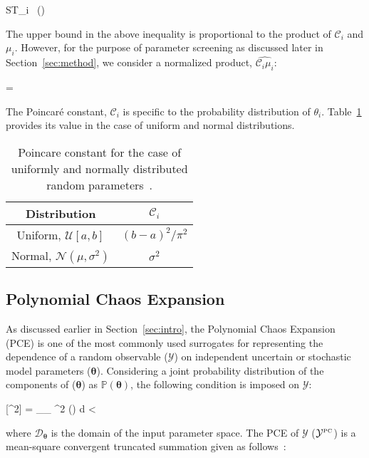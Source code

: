 \be
ST_i \leq {}~(\propto {})
\label{eq:bound}
\ee

The upper bound in the above inequality is proportional to the product of $\mathcal{C}_i$
and $\mu_i$. However, for the purpose of parameter screening as discussed later in
Section~\ref{sec:method}, we consider a normalized product, $\hat{\mathcal{C}_i\mu_i}$:

\be
{} = 
\ee

The Poincar\'e constant, $\mathcal{C}_i$ is specific to the probability distribution of $\theta_i$.
Table~\ref{tab:poincare} provides its value in the case of uniform and normal
distributions.
\bigskip

\begin{table}[htbp]
\renewcommand*{\arraystretch}{1.2}
\begin{center}
\begin{tabular}{|c|c|}
\hline
Distribution & $\mathcal{C}_i$ \\ \hline \hline 
Uniform, $\mathcal{U}[a, b]$ & $(b-a)^{2}/\pi^2$ \\ 
Normal, $\mathcal{N}(\mu,\sigma^2)$ & $\sigma^2$ \\ 
\hline
\end{tabular}
\end{center}

\caption{Poincare constant for the case of uniformly and normally distributed random
parameters~\cite{Roustant:2014}.}
\label{tab:poincare}
\end{table}

\subsection{Polynomial Chaos Expansion}

As discussed earlier in Section~\ref{sec:intro}, the Polynomial Chaos Expansion (PCE)
is one of the most commonly used surrogates for representing the dependence of a random
observable ($\mathcal{Y}$) on independent uncertain or stochastic model parameters ($\bm{\theta}$).
Considering a joint probability distribution of the components of ($\bm{\theta}$) as $\mathbb{P}(\bm{\theta})$,
the following condition is imposed on $\mathcal{Y}$:

\be
{}[^2] = \int_{_{\bm{\theta}}} ^2 (\bm{\theta}) 
d\bm{\theta} < \infty
\ee

\noindent where $\mathcal{D}_{\bm{\theta}}$ is the domain of the input parameter space. The PCE of
$\mathcal{Y}$ ($\mathcal{Y}^{\mbox{\tiny {PC}}}$) is a mean-square 
convergent truncated summation given as
follows~\cite{Xiu:2002,Ghanem:2003,Olivier:2010}:

